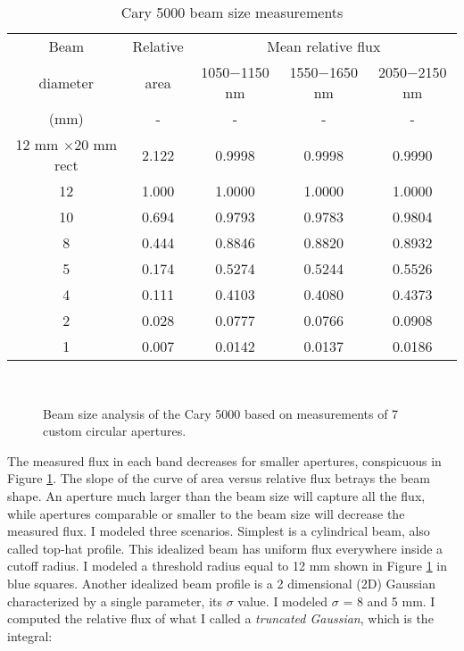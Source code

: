 \begin{longtable}{ccccc}
    \caption[Cary 5000 beam size]{Cary 5000 beam size measurements} \label{tab:C5000beam} \\
    \hline
     Beam & Relative & \multicolumn{3}{c}{Mean relative flux} \\  \cline{3-5}
     diameter & area &  1050$-$1150 nm & 1550$-$1650 nm & 2050$-$2150 nm\\ 
	(mm) & - & - & - & -\\ 
    \hline
    	12 mm $\times$20 mm rect & 2.122 & 0.9998 & 0.9998 & 0.9990 \\
	\hline 
12	&1.000	&1.0000	&1.0000	&1.0000\\
10	&0.694	&0.9793	&0.9783	&0.9804\\
8	&0.444	&0.8846	&0.8820	&0.8932\\
5	&0.174	&0.5274	&0.5244	&0.5526\\
4	&0.111	&0.4103	&0.4080	&0.4373\\
2	&0.028	&0.0777	&0.0766	&0.0908\\
1	&0.007	&0.0142	&0.0137	&0.0186	\\
    \hline
\end{longtable}

\begin{figure}[h!] 
\begin{center}
\ 
\caption[Cary 5000 beam size]{Beam size analysis of the Cary 5000 based on measurements of 7 custom circular apertures.  }
\label{fig:Cary5000beam}
\end{center}
\end{figure}

The measured flux in each band decreases for smaller apertures, conspicuous in Figure \ref{fig:Cary5000beam}.  The slope of the curve of area versus relative flux betrays the beam shape.  An aperture much larger than the beam size will capture all the flux, while apertures comparable or smaller to the beam size will decrease the measured flux.  I modeled three scenarios.  Simplest is a cylindrical beam, also called top-hat profile.  This idealized beam has uniform flux everywhere inside a cutoff radius.  I modeled a threshold radius equal to 12 mm shown in Figure \ref{fig:Cary5000beam} in blue squares.  Another idealized beam profile is a 2 dimensional (2D) Gaussian characterized by a single parameter, its $\sigma$ value.  I modeled $\sigma$ = 8 and 5 mm.  I computed the relative flux of what I called a \emph{truncated Gaussian}, which is the integral:

